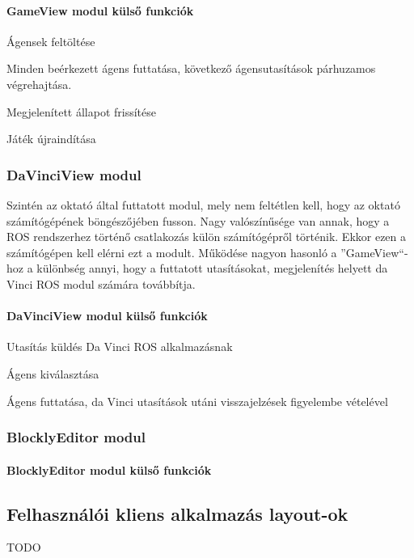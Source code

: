 \documentclass[12pt,a4paper,oneside]{report} %
\begin{document}
\paragraph{GameView modul külső funkciók}
\begin{compactitem}
	\item Ágensek feltöltése
	\item Minden beérkezett ágens futtatása, következő ágensutasítások párhuzamos végrehajtása.
	\item Megjelenített állapot frissítése
	\item Játék újraindítása
\end{compactitem}

\subsubsection{DaVinciView modul}
Szintén az oktató által futtatott modul, mely nem feltétlen kell, hogy az oktató számítógépének böngészőjében fusson. Nagy valószínűsége van annak, hogy a ROS rendszerhez történő csatlakozás külön számítógépről történik. Ekkor ezen a számítógépen kell elérni ezt a modult. Működése nagyon hasonló a ''GameView``-hoz a különbség annyi, hogy a futtatott utasításokat, megjelenítés helyett da Vinci ROS modul számára továbbítja.

\paragraph{DaVinciView modul külső funkciók}
\begin{compactitem}
	\item Utasítás küldés Da Vinci ROS alkalmazásnak
	\item Ágens kiválasztása
	\item Ágens futtatása, da Vinci utasítások utáni visszajelzések figyelembe vételével
\end{compactitem}

\subsubsection{BlocklyEditor modul}
\paragraph{BlocklyEditor modul külső funkciók}

\subsection{Felhasználói kliens alkalmazás layout-ok}
TODO
\end{document}
